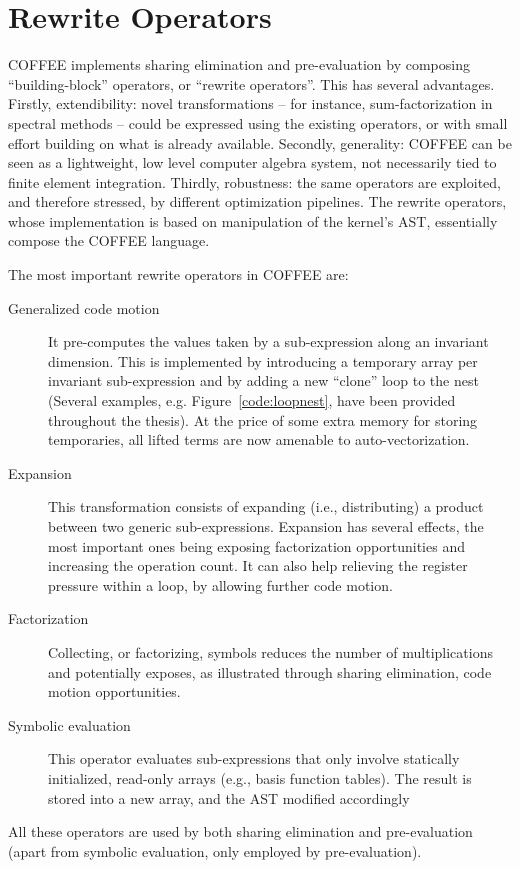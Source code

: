 \section{Rewrite Operators}
\label{sec:coffee:rewrite-ops}
COFFEE implements sharing elimination and pre-evaluation by composing ``building-block'' operators, or ``rewrite operators''. This has several advantages. Firstly, extendibility: novel transformations -- for instance, sum-factorization in spectral methods -- could be expressed using the existing operators, or with small effort building on what is already available. Secondly, generality: COFFEE can be seen as a lightweight, low level computer algebra system, not necessarily tied to finite element integration. Thirdly, robustness: the same operators are exploited, and therefore stressed, by different optimization pipelines. The rewrite operators, whose implementation is based on manipulation of the kernel's AST, essentially compose the COFFEE language. 

The most important rewrite operators in COFFEE are:
\begin{description}
\item[Generalized code motion] It pre-computes the values taken by a sub-expression along an invariant dimension. This is implemented by introducing a temporary array per invariant sub-expression and by adding a new ``clone'' loop to the nest (Several examples, e.g. Figure~\ref{code:loopnest}, have been provided throughout the thesis). At the price of some extra memory for storing temporaries, all lifted terms are now amenable to auto-vectorization. 
\item[Expansion] This transformation consists of expanding (i.e., distributing) a product between two generic sub-expressions. Expansion has several effects, the most important ones being exposing factorization opportunities and increasing the operation count. It can also help relieving the register pressure within a loop, by allowing further code motion.
\item[Factorization] Collecting, or factorizing, symbols reduces the number of multiplications and potentially exposes, as illustrated through sharing elimination, code motion opportunities.
\item[Symbolic evaluation] This operator evaluates sub-expressions that only involve statically initialized, read-only arrays (e.g., basis function tables). The result is stored into a new array, and the AST modified accordingly
\end{description}
All these operators are used by both sharing elimination and pre-evaluation (apart from symbolic evaluation, only employed by pre-evaluation).

